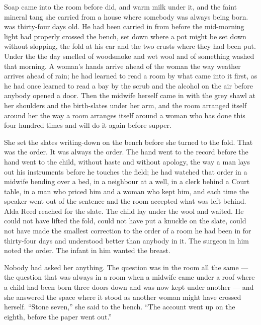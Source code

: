 
Soap came into the room before  did, and warm milk under it, and the faint mineral tang she carried from a house where somebody was always being born.  was thirty-four days old. He had been carried in from  before the mid-morning light had properly crossed the bench, set down where a pot might be set down without slopping, the fold at his ear and the two crusts where they had been put. Under the  the day smelled of woodsmoke and wet wool and of something washed that morning. A woman's hands arrive ahead of the woman the way weather arrives ahead of rain; he had learned to read a room by what came into it first, as he had once learned to read a bay by the scrub and the alcohol on the air before anybody opened a door. Then the midwife herself came in with the grey shawl at her shoulders and the birth-slates under her arm, and the room arranged itself around her the way a room arranges itself around a woman who has done this four hundred times and will do it again before supper.

She set the slates writing-down on the bench before she turned to the fold. That was the order. It was always the order. The hand went to the record before the hand went to the child, without haste and without apology, the way a man lays out his instruments before he touches the field; he had watched that order in a midwife bending over a bed, in a neighbour at a well, in a clerk behind a Court table, in a man who priced him and a woman who kept him, and each time the speaker went out of the sentence and the room accepted what was left behind. Alda Reed reached for the slate. The child lay under the wool and waited. He could not have lifted the fold, could not have put a knuckle on the slate, could not have made the smallest correction to the order of a room he had been in for thirty-four days and understood better than anybody in it. The surgeon in him noted the order. The infant in him wanted the breast.

Nobody had asked her anything. The question was in the room all the same --- the question that was always in a room when a midwife came under a roof where a child had been born three doors down and was now kept under another --- and she answered the space where it stood as another woman might have crossed herself. “Stone seven,” she said to the bench. “The account went up on the eighth, before the paper went out.”

